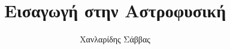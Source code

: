\documentclass[hidelinks, a4paper, 12pt]{report}
\title{Εισαγωγή στην Αστροφυσική}
\author{Χανλαρίδης Σάββας}
\begin{document}
    
    
    
    \renewcommand{\contentsname}{Περιεχόμενα}
    \renewcommand{\listfigurename}{Λίστα Σχημάτων}
    \renewcommand{\listtablename}{Λίστα Πινάκων}
    \renewcommand{\chaptername}{Κεφάλαιο}
    \renewcommand{\appendixname}{Παράρτημα}
    \renewcommand{\bibname}{Βιβλιογραφία}
    
    \setlength{\parskip}{0.5em}     %

    \tableofcontents
    
    \newpage
    
    \setlength{\parskip}{1em}       %

    
    
    
    
    
    
    
    
    
    
    \appendix
    
    
    
    
    
\end{document}
